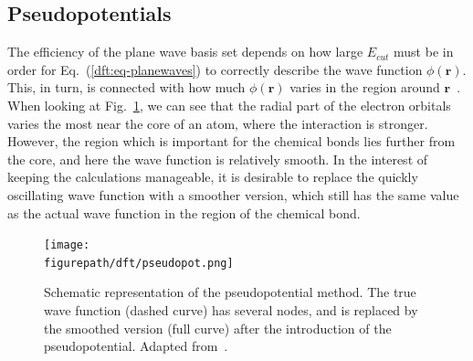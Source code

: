 \begin{refsection}
\subsection{Pseudopotentials} 
 
The efficiency of the plane wave basis set depends on 
how large $E_{cut}$ must be in order for Eq.~(\ref{dft:eq-planewaves}) to correctly describe the wave function $\phi (\mathbf{r})$. 
This, in turn, is connected with how much $\phi (\mathbf{r})$ varies in the 
region around $\mathbf{r}$~\cite{Kohanoff2006}. When looking at 
Fig.~\ref{dft:fig-pseudo}, we can see that the radial part of the electron 
orbitals varies the most near the core of an atom, where the interaction is 
stronger. However, the region which is important for the chemical bonds lies 
further from the core, and here the wave function is relatively smooth. In the 
interest of keeping the calculations manageable, it is desirable to replace 
the quickly oscillating wave function with a smoother version, which still has 
the same value as the actual wave function in the region of the chemical bond. 
 
\begin{figure}[ht]  
\captionsetup{width=0.8\textwidth} 
\centering 
\texttt{[image: \\figurepath/dft/pseudopot.png]} 
\caption{\label{dft:fig-pseudo} Schematic representation of the pseudopotential 
method. The true wave function (dashed curve) has several nodes, and is 
replaced by the smoothed version (full curve) after the introduction of the 
pseudopotential. Adapted from~\cite{Singh2006}.} 
\end{figure} 
 

\end{refsection}
